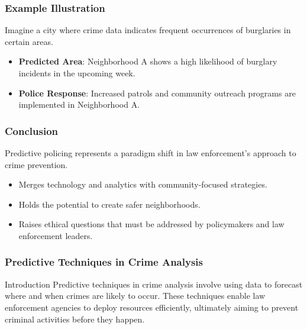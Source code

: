 \documentclass[aspectratio=169]{beamer}
\begin{document}
\begin{frame}[fragile]
    \frametitle{Example Illustration}
    Imagine a city where crime data indicates frequent occurrences of burglaries in certain areas.
    
    \begin{itemize}
        \item \textbf{Predicted Area}: Neighborhood A shows a high likelihood of burglary incidents in the upcoming week.
        \item \textbf{Police Response}: Increased patrols and community outreach programs are implemented in Neighborhood A.
    \end{itemize}
\end{frame}

\begin{frame}[fragile]
    \frametitle{Conclusion}
    Predictive policing represents a paradigm shift in law enforcement's approach to crime prevention.
    
    \begin{itemize}
        \item Merges technology and analytics with community-focused strategies.
        \item Holds the potential to create safer neighborhoods.
        \item Raises ethical questions that must be addressed by policymakers and law enforcement leaders.
    \end{itemize}
\end{frame}

\begin{frame}
    \frametitle{Predictive Techniques in Crime Analysis}
    \begin{block}{Introduction}
        Predictive techniques in crime analysis involve using data to forecast where and when crimes are likely to occur. 
        These techniques enable law enforcement agencies to deploy resources efficiently, ultimately aiming to prevent criminal activities before they happen.
    \end{block}
\end{frame}
\end{document}
